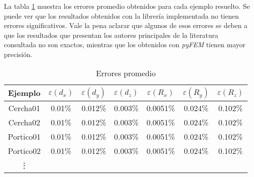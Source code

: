 La tabla \ref{tab:errorPromedio} muestra los errores promedio obtenidos para cada ejemplo resuelto. Se puede ver que los resultados obtenidos con la librería implementada no tienen errores significativos. Vale la pena aclarar que algunos de esos errores se deben a que los resultados que presentan los autores principales de la literatura consultada no son exactos, mientras que los obtenidos con \textit{pyFEM} tienen mayor precisión.

\begin{table}[htbp]
    \centering
    \begin{tabular}{c|ccc|ccc}
        \hline 
        Ejemplo & $\varepsilon (d_x)$ & $\varepsilon (d_y)$ & $\varepsilon (d_z)$ & $\varepsilon (R_x)$ & $\varepsilon (R_y)$ & $\varepsilon (R_z)$ \\
        \hline 
        Cercha01 & 0.01\% & 0.012\% & 0.003\% & 0.0051\% & 0.024\% & 0.102\% \\
        Cercha02 & 0.01\% & 0.012\% & 0.003\% & 0.0051\% & 0.024\% & 0.102\% \\
        Portico01 & 0.01\% & 0.012\% & 0.003\% & 0.0051\% & 0.024\% & 0.102\% \\
        Portico02 & 0.01\% & 0.012\% & 0.003\% & 0.0051\% & 0.024\% & 0.102\% \\
        \vdots & & & & & & \\
        \hline 
    \end{tabular}
    \caption{Errores promedio}
    \label{tab:errorPromedio}
\end{table}
